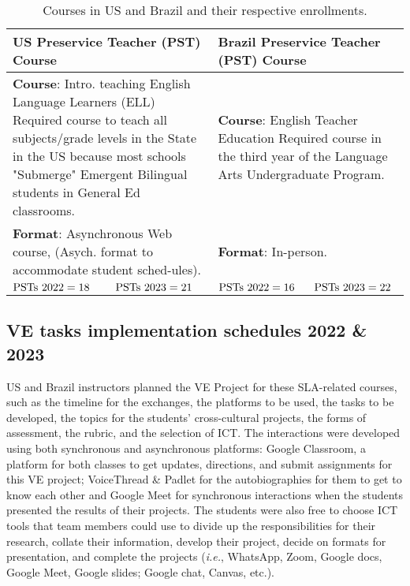 \begin{table}[htpb]
\centering
\begin{threeparttable}
\caption{Courses in US and Brazil and their respective enrollments.}
\label{tab-01}
\small
\setlength{\tabcolsep}{3pt}
\begin{tabular}{*{4}{p{}}}
\toprule
\multicolumn{2}{p{0.46\textwidth}}{US Preservice Teacher (PST) Course} & \multicolumn{2}{p{0.46\textwidth}}{Brazil Preservice Teacher (PST) Course} \\
\midrule    
\multicolumn{2}{p{0.5\textwidth}}{\textbf{Course}: Intro. teaching English Language Learners (ELL)
\newline *Required course to teach all subjects/grade levels in the State in the US because most schools "Submerge" Emergent Bilingual students in General Ed classrooms.
} & 
\multicolumn{2}{p{0.5\textwidth}}{\textbf{Course}: English Teacher Education
\newline *Required course in the third year of the Language Arts Undergraduate Program.}
\\

\multicolumn{2}{p{0.5\textwidth}}{\textbf{Format}: Asynchronous Web course, (Asych. format to accommodate student sched-ules).} & \multicolumn{2}{p{0.5\textwidth}}{\textbf{Format}: In-person.}
\\
				
$\textmd{PSTs 2022} = 18$ & $\textmd{PSTs  2023} = 21$	& $\textmd{PSTs  2022} = 16$ & $\textmd{PSTs  2023} = 22$ \\
\bottomrule
\end{tabular}
\end{threeparttable}
\end{table}
		
\subsection{VE tasks implementation schedules 2022 \& 2023}\label{sub-sec-vetasksimplementation}
	
US and Brazil instructors planned the VE Project for these SLA-related
courses, such as the timeline for the exchanges, the platforms to be
used, the tasks to be developed, the topics for the students'
cross-cultural projects, the forms of assessment, the rubric, and the
selection of ICT. The interactions were developed using both synchronous
and asynchronous platforms: Google Classroom, a platform for both
classes to get updates, directions, and submit assignments for this VE
project; VoiceThread \& Padlet for the autobiographies for them to get
to know each other and Google Meet for synchronous interactions when the
students presented the results of their projects. The students were also
free to choose ICT tools that team members could use to divide up the
responsibilities for their research, collate their information, develop
their project, decide on formats for presentation, and complete the
projects (\emph{i.e.}, WhatsApp, Zoom, Google docs, Google Meet, Google
slides; Google chat, Canvas, etc.).
	
